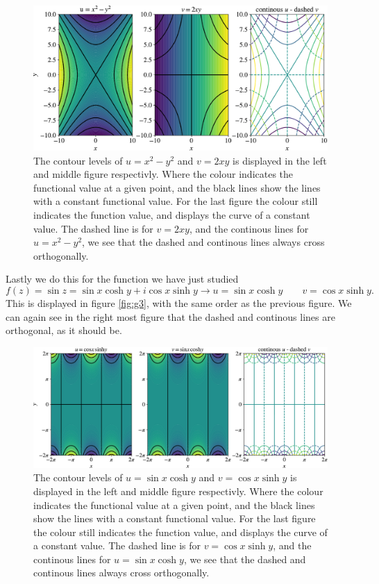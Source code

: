 \documentclass[12pt,twoside]{article}
\begin{document}
\begin{figure}
  \centering
  \includegraphics[width=\textwidth]{../figures/secound.pdf}
  \caption{The contour levels of $u=x^2-y^2$ and $v=2xy$ is displayed in the left and middle figure respectivly. Where the colour indicates the functional value at a given point, and the black lines show the lines with a constant functional value. For the last figure the colour still indicates the function value, and displays the curve of a  constant value. The dashed line is for $v=2xy$, and the continous lines for $u=x^2-y^2$, we see that the dashed and continous lines always cross orthogonally.}
  \label{fig:g2}
\end{figure}
Lastly we do this for the function we have just studied
\begin{equation}
  f(z) = \sin{z} = \sin{x}\cosh{y}+i\cos{x}\sinh{y} \rightarrow u=\sin{x}\cosh{y}\qquad v=\cos{x}\sinh{y}.
\end{equation}
This is displayed in figure \vref{fig:g3}, with the same order as the previous figure. We can again see in the right most figure that the dashed and continous lines are orthogonal, as it should be.
\begin{figure}
  \centering
  \includegraphics[width=\textwidth]{../figures/third.pdf}
  \caption{The contour levels of $u=\sin{x}\cosh{y}$ and $v=\cos{x}\sinh{y}$ is displayed in the left and middle figure respectivly. Where the colour indicates the functional value at a given point, and the black lines show the lines with a constant functional value. For the last figure the colour still indicates the function value, and displays the curve of a  constant value. The dashed line is for $v=\cos{x}\sinh{y}$, and the continous lines for $u=\sin{x}\cosh{y}$, we see that the dashed and continous lines always cross orthogonally.}
  \label{fig:g3}
\end{figure}
\end{document}
